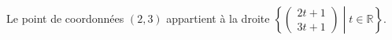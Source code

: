 Le point de coordonnées $(2,3)$ appartient à la droite  $\left\{\begin{pmatrix}2t+1\\3t+1\end{pmatrix}\middle| t\in\mathbb{R}\right\}$.

\begin{reponses}
\end{reponses}

